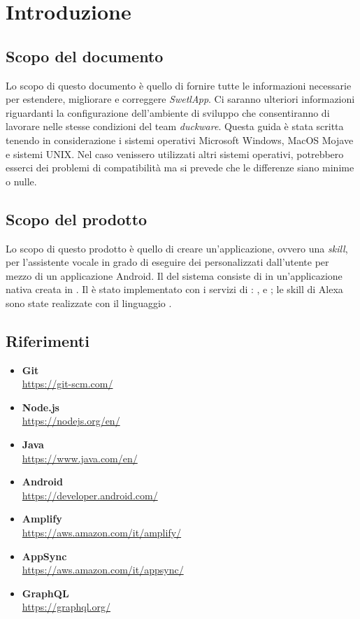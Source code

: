\pagebreak
\section{Introduzione}
\label{sec:intro}
\subsection{Scopo del documento}
Lo scopo di questo documento è quello di fornire tutte le informazioni necessarie per estendere, migliorare e correggere \textit{SwetlApp}. Ci saranno ulteriori informazioni riguardanti la configurazione dell'ambiente di sviluppo che consentiranno di lavorare nelle stesse condizioni del team \textit{duckware}. 
Questa guida è stata scritta tenendo in considerazione i sistemi operativi Microsoft Windows, MacOS Mojave e sistemi UNIX. Nel caso venissero utilizzati altri sistemi operativi, potrebbero esserci dei problemi di compatibilità ma si prevede che le differenze siano minime o nulle.
\subsection{Scopo del prodotto}
Lo scopo di questo prodotto è quello di creare un'applicazione, ovvero una \textit{\Gls{skill}}, per l'assistente vocale   in grado di eseguire dei  personalizzati dall'utente per mezzo di un applicazione \Gls{Android}.
Il  del sistema consiste di in un'applicazione nativa creata in . Il  è stato implementato con i servizi di : ,  e ; le skill di Alexa sono state realizzate con il linguaggio .
\subsection{Riferimenti}
\begin{itemize}
    \item \textbf{Git}\\ \href{https://git-scm.com/}{https://git-scm.com/}
    \item \textbf{Node.js}\\ \href{https://nodejs.org/en/}{https://nodejs.org/en/}
    \item \textbf{Java}\\ \href{https://www.java.com/en/}{https://www.java.com/en/}
    \item \textbf{Android}\\ \href{https://developer.android.com/}{https://developer.android.com/}
    \item \textbf{Amplify}\\ \href{https://aws.amazon.com/it/amplify/}{https://aws.amazon.com/it/amplify/}
    \item \textbf{AppSync}\\ \href{https://aws.amazon.com/it/appsync/}{https://aws.amazon.com/it/appsync/}
    \item \textbf{GraphQL}\\ \href{https://graphql.org/}{https://graphql.org/}
    
\end{itemize}
